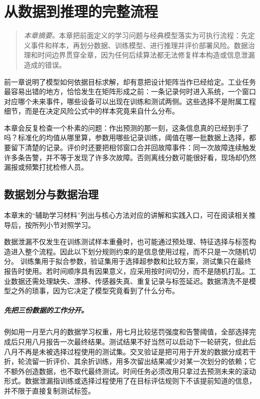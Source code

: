 ﻿\chapter{从数据到推理的完整流程}
\label{chap:pipeline}
\begin{quote}\small
\textit{本章摘要。}本章把前面定义的学习问题与经典模型落实为可执行流程：先定义事件和样本，再划分数据、训练模型、进行推理并评价部署风险。数据治理和时间边界贯穿全章，因为任何后续算法都无法修复样本构造或信息泄漏造成的错误。
\end{quote}
前一章说明了模型如何依据目标求解，却有意把设计矩阵当作已经给定。工业任务最容易出错的地方，恰恰发生在矩阵形成之前：一条记录何时进入系统，一个窗口对应哪个未来事件，哪些设备可以出现在训练和测试两侧。这些选择不是附属工程细节，而是在决定风险公式中的样本究竟来自什么分布。

本章会反复检查一个朴素的问题：作出预测的那一刻，这条信息真的已经到手了吗？标准化的均值从哪里算，参数用哪些记录训练，阈值在哪一批数据上选择，都要留下清楚的记录。评价时还要把相邻窗口合并回故障事件：同一次故障连续触发许多条告警，并不等于发现了许多次故障。否则离线分数可能很好看，现场却仍然漏报或频繁打扰检修人员。

\section{数据划分与数据治理}

本章末的“辅助学习材料”列出与核心方法对应的讲解和实践入口，可在阅读相关推导后，按所列小节对照学习。

数据泄漏不仅发生在训练测试样本重叠时，也可能通过预处理、特征选择与标签构造进入整个流程\cite{kaufman2012leakage}。因此以下划分规则约束的是信息使用过程，而不只是一次随机切分。
训练集用于拟合参数，验证集用于选择超参数和比较方案，测试集只在最终报告时使用。若时间顺序具有因果意义，应采用按时间切分，而不是随机打乱。工业数据还需处理缺失、漂移、传感器失真、重复记录与标签延迟。数据清洗不是模型之外的琐事，因为它决定了模型究竟看到了什么分布。

\paragraph{先把三份数据的工作分开。}
例如用一月至六月的数据学习权重，用七月比较惩罚强度和告警阈值，全部选择完成后只用八月报告一次最终结果。测试结果不好当然可以启动下一轮研究，但此后八月不再是未被选择过程使用的测试集。交叉验证是把可用于开发的数据分成若干折，轮流留一折评价、其余折训练，用多次留出结果减少对某一次划分的依赖；它不额外创造数据，也不取代最终测试。时间任务必须改用只拿过去预测未来的滚动形式。数据泄漏指训练或选择过程使用了在目标评估规则下不该提前知道的信息，并不限于直接复制测试标签。

